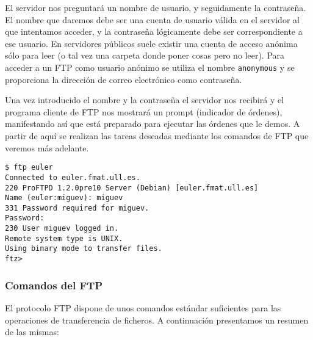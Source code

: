 El servidor  nos preguntará  un nombre de  usuario, y  seguidamente la
contraseña.  El nombre  que daremos  debe  ser una  cuenta de  usuario
válida  en el  servidor al  que  intentamos acceder,  y la  contraseña
lógicamente  debe ser  correspondiente  a ese  usuario. En  servidores
públicos suele existir una cuenta de  acceso anónima sólo para leer (o
tal vez una carpeta donde poner cosas pero no leer). Para acceder a un
FTP como  usuario anónimo se  utiliza el  nombre {\tt anonymous}  y se
proporciona la dirección de correo electrónico como contraseña.

Una vez introducido el nombre y la contraseña el servidor nos recibirá
y el programa cliente de FTP nos mostrará un prompt (indicador de
órdenes), manifestando así que está preparado para ejecutar las
órdenes que le demos. A partir de aquí se realizan las tareas deseadas
mediante los comandos de FTP que veremos más adelante.

\begin{verbatim}
$ ftp euler
Connected to euler.fmat.ull.es.
220 ProFTPD 1.2.0pre10 Server (Debian) [euler.fmat.ull.es]
Name (euler:miguev): miguev
331 Password required for miguev.
Password:
230 User miguev logged in.
Remote system type is UNIX.
Using binary mode to transfer files.
ftz>
\end{verbatim}


\subsubsection{Comandos del FTP}

El  protocolo  FTP dispone  de  unos  comandos estándar  suficientes
para  las operaciones  de  transferencia de  ficheros. A  continuación
presentamos un resumen de las mismas:

